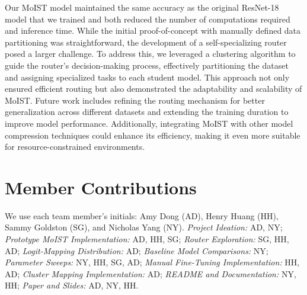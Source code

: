 \documentclass[conference]{IEEEtran}
\begin{document}
Our MoIST model maintained the same accuracy as the original ResNet-18 model that we trained and both reduced the number of computations required and inference time. While the initial proof-of-concept with manually defined data partitioning was straightforward, the development of a self-specializing router posed a larger challenge. To address this, we leveraged a clustering algorithm to guide the router's decision-making process, effectively partitioning the dataset and assigning specialized tasks to each student model. This approach not only ensured efficient routing but also demonstrated the adaptability and scalability of MoIST. Future work includes refining the routing mechanism for better generalization across different datasets and extending the training duration to improve model performance. Additionally, integrating MoIST with other model compression techniques could enhance its efficiency, making it even more suitable for resource-constrained environments.

\section{Member Contributions}
We use each team member's initials: Amy Dong (AD), Henry Huang (HH), Sammy Goldston (SG), and Nicholas Yang (NY). \textit{Project Ideation:} AD, NY; \textit{Prototype MoIST Implementation:} AD, HH, SG; \textit{Router Exploration:} SG, HH, AD; \textit{Logit-Mapping Distribution:} AD; \textit{Baseline Model Comparisons:} NY; \textit{Parameter Sweeps:} NY, HH, SG, AD; \textit{Manual Fine-Tuning Implementation:} HH, AD; \textit{Cluster Mapping Implementation:} AD; \textit{README and Documentation:} NY, HH; \textit{Paper and Slides:} AD, NY, HH.



\end{document}
